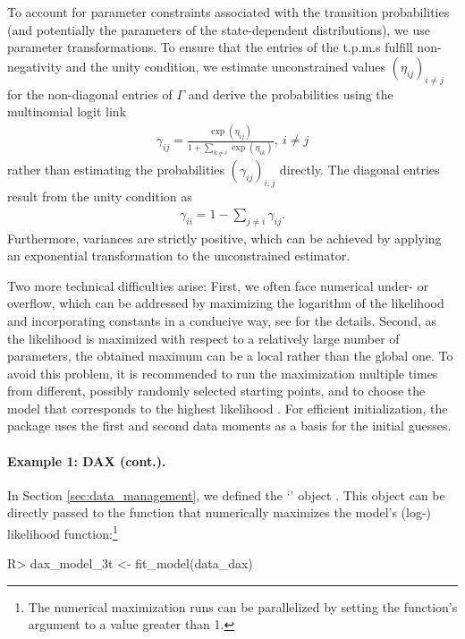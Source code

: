 \documentclass[article,shortnames]{jss}
\newcommand{\class}[1]{`\code{#1}'}
\newcommand{\fct}[1]{\code{#1()}}
\begin{document}
To account for parameter constraints associated with the transition probabilities (and potentially the parameters of the state-dependent distributions), we use parameter transformations. To ensure that the entries of the t.p.m.s fulfill non-negativity and the unity condition, we estimate unconstrained values $(\eta_{ij})_{i\neq j}$ for the non-diagonal entries of $\Gamma$ and derive the probabilities using the multinomial logit link
\begin{align*}
\gamma_{ij}=\frac{\exp(\eta_{ij})}{1+\sum_{k\neq i}\exp(\eta_{ik})},~i\neq j
\end{align*}
rather than estimating the probabilities $(\gamma_{ij})_{i,j}$ directly. The diagonal entries result from the unity condition as
\begin{align*}
\gamma_{ii}=1-\sum_{j\neq i}\gamma_{ij}.
\end{align*}
Furthermore, variances are strictly positive, which can be achieved by applying an exponential transformation to the unconstrained estimator.

Two more technical difficulties arise: First, we often face numerical under- or overflow, which can be addressed by maximizing the logarithm of the likelihood and incorporating constants in a conducive way, see \cite{oel21} for the details. Second, as the likelihood is maximized with respect to a relatively large number of parameters, the obtained maximum can be a local rather than the global one. To avoid this problem, it is recommended to run the maximization multiple times from different, possibly randomly selected starting points, and to choose the model that corresponds to the highest likelihood \citep{zuc16}. For efficient initialization, the  package uses the first and second data moments as a basis for the initial guesses.

\paragraph{Example 1: DAX (cont.).} In Section \ref{sec:data_management}, we defined the \class{fHMM\_data} object . This object can be directly passed to the \fct{fit\_model} function that numerically maximizes the model's (log-) likelihood function:\footnote{The numerical maximization runs can be parallelized by setting the function's  argument to a value greater than 1.}

%
\begin{Schunk}
\begin{Sinput}
R> dax_model_3t <- fit_model(data_dax)
\end{Sinput}
\end{Schunk}
%
\end{document}
